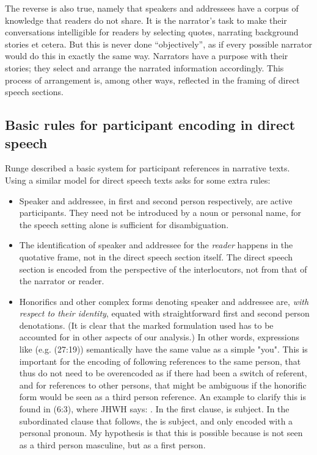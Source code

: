 \documentclass[twoside,a4paper,10pt]{article}
\newcommand{\cl}[2]{\begingroup\beginL\begingroup\color{#1}\beginR#2\endR\endgroup\endL\endgroup}
\newcommand{\hebr}[1]{\cjRL{#1}}
\begin{document}
The reverse is also true, namely that speakers and addressees have a corpus of knowledge that readers do not share. It is the narrator's task to make their conversations intelligible for readers by selecting quotes, narrating background stories et cetera. But this is never done ``objectively'', as if every possible narrator would do this in exactly the same way. Narrators have a purpose with their stories; they select and arrange the narrated information accordingly. This process of arrangement is, among other ways, reflected in the framing of direct speech sections.

\subsection{Basic rules for participant encoding in direct speech}
Runge \autocite{Runge} described a basic system for participant references in narrative texts. Using a similar model for direct speech texts asks for some extra rules:
\begin{itemize}
    \item Speaker and addressee, in first and second person respectively, are active participants. They need not be introduced by a noun or personal name, for the speech setting alone is sufficient for disambiguation.
    \item The identification of speaker and addressee for the \emph{reader} happens in the quotative frame, not in the direct speech section itself. The direct speech section is encoded from the perspective of the interlocutors, not from that of the narrator or reader.
    \item Honorifics and other complex forms denoting speaker and addressee are, \emph{with respect to their identity}, equated with straightforward first and second person denotations. (It is clear that the marked formulation used has to be accounted for in other aspects of our analysis.) In other words, expressions like \hebr{NPCK} (e.g. (27:19)) semantically have the same value as a simple "you". This is important for the encoding of following references to the same person, that thus do not need to be overencoded as if there had been a switch of referent, and for references to other persons, that might be ambiguous if the honorific form would be seen as a third person reference. An example to clarify this is found in (6:3), where JHWH says: \hebr{L> JDWN \cl{red}{RWXJ} B H >DM L <WLM B C GM \cl{red}{HJW} BFR}. In the first clause, \hebr{RWXJ} is subject. In the subordinated clause that follows, the \hebr{>DM} is subject, and only encoded with a personal pronoun. My hypothesis is that this is possible because \hebr{RWXJ} is not seen as a third person masculine, but as a first person. 
\end{itemize}
\end{document}
